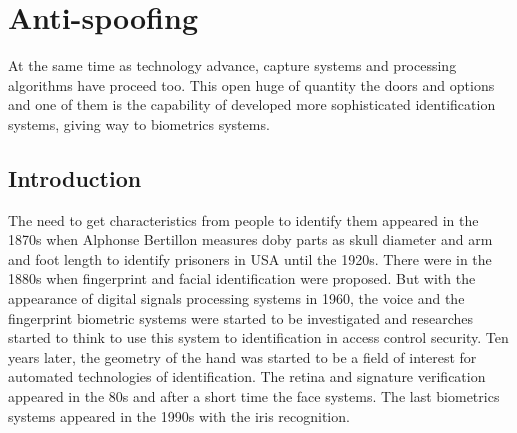 \section{Anti-spoofing}
At the same time as technology advance, capture systems and processing algorithms have proceed too. This open huge of quantity the doors and options and one of them is the capability of developed more sophisticated identification systems, giving way to biometrics systems.\\

\subsection{Introduction}
The need to get characteristics from people to identify them appeared in the 1870s when Alphonse Bertillon measures doby parts as skull diameter and arm and foot length to identify prisoners in USA until the 1920s. There were in the 1880s when fingerprint and facial identification were proposed. But with the appearance of digital signals processing systems in 1960, the voice and the fingerprint biometric systems were started to be investigated and researches started to think to use this system to identification in access control security. Ten years later, the geometry of the hand was started to be a field of interest for automated technologies of identification. The retina and signature verification appeared in the 80s and after a short time the face systems. The last biometrics systems appeared in the 1990s with the iris recognition\cite{Intro_biometrics}.\\


